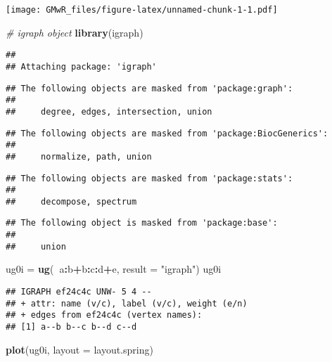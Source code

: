 \documentclass[]{article}
\newenvironment{Shaded}{\begin{snugshade}}{\end{snugshade}}
\newcommand{\KeywordTok}[1]{\textcolor[rgb]{0.13,0.29,0.53}{\textbf{#1}}}
\newcommand{\DataTypeTok}[1]{\textcolor[rgb]{0.13,0.29,0.53}{#1}}
\newcommand{\StringTok}[1]{\textcolor[rgb]{0.31,0.60,0.02}{#1}}
\newcommand{\CommentTok}[1]{\textcolor[rgb]{0.56,0.35,0.01}{\textit{#1}}}
\newcommand{\OperatorTok}[1]{\textcolor[rgb]{0.81,0.36,0.00}{\textbf{#1}}}
\newcommand{\NormalTok}[1]{#1}
\begin{document}
\texttt{[image: GMwR\_files/figure-latex/unnamed-chunk-1-1.pdf]}

\begin{Shaded}
\begin{Highlighting}[]
\CommentTok{# igraph object}
\KeywordTok{library}\NormalTok{(igraph)}
\end{Highlighting}
\end{Shaded}

\begin{verbatim}
## 
## Attaching package: 'igraph'
\end{verbatim}

\begin{verbatim}
## The following objects are masked from 'package:graph':
## 
##     degree, edges, intersection, union
\end{verbatim}

\begin{verbatim}
## The following objects are masked from 'package:BiocGenerics':
## 
##     normalize, path, union
\end{verbatim}

\begin{verbatim}
## The following objects are masked from 'package:stats':
## 
##     decompose, spectrum
\end{verbatim}

\begin{verbatim}
## The following object is masked from 'package:base':
## 
##     union
\end{verbatim}

\begin{Shaded}
\begin{Highlighting}[]
\NormalTok{ug0i =}\StringTok{ }\KeywordTok{ug}\NormalTok{(}\OperatorTok{~}\NormalTok{a}\OperatorTok{:}\NormalTok{b}\OperatorTok{+}\NormalTok{b}\OperatorTok{:}\NormalTok{c}\OperatorTok{:}\NormalTok{d}\OperatorTok{+}\NormalTok{e, }\DataTypeTok{result =} \StringTok{"igraph"}\NormalTok{)}
\NormalTok{ug0i}
\end{Highlighting}
\end{Shaded}

\begin{verbatim}
## IGRAPH ef24c4c UNW- 5 4 -- 
## + attr: name (v/c), label (v/c), weight (e/n)
## + edges from ef24c4c (vertex names):
## [1] a--b b--c b--d c--d
\end{verbatim}

\begin{Shaded}
\begin{Highlighting}[]
\KeywordTok{plot}\NormalTok{(ug0i, }\DataTypeTok{layout =}\NormalTok{ layout.spring)}
\end{Highlighting}
\end{Shaded}
\end{document}
